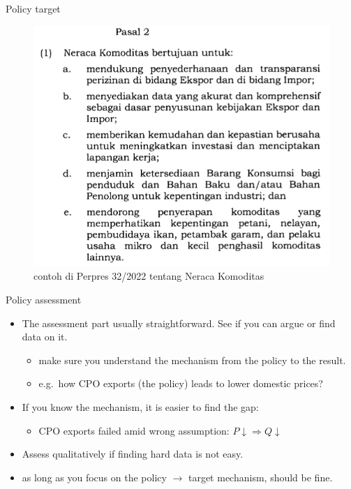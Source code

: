 \documentclass[
  ignorenonframetext,
]{beamer}
\providecommand{\tightlist}{%
  \setlength{\itemsep}{0pt}\setlength{\parskip}{0pt}}\usepackage{longtable,booktabs,array}
\begin{document}
\begin{frame}{Policy target}
\protect\hypertarget{policy-target}{}
\begin{figure}

{\centering \includegraphics{goal.png}

}

\caption{contoh di Perpres 32/2022 tentang Neraca Komoditas}

\end{figure}
\end{frame}

\begin{frame}{Policy assessment}
\protect\hypertarget{policy-assessment}{}
\begin{itemize}
\item
  The assessment part usually straightforward. See if you can argue or
  find data on it.

  \begin{itemize}
  \item
    make sure you understand the mechanism from the policy to the
    result.
  \item
    e.g.~how CPO exports (the policy) leads to lower domestic prices?
  \end{itemize}
\item
  If you know the mechanism, it is easier to find the gap:

  \begin{itemize}
  \tightlist
  \item
    CPO exports failed amid wrong assumption:
    \(P\downarrow \Rightarrow Q\downarrow\)
  \end{itemize}
\item
  Assess qualitatively if finding hard data is not easy.
\item
  as long as you focus on the policy \(\rightarrow\) target mechanism,
  should be fine.
\end{itemize}
\end{frame}
\end{document}
